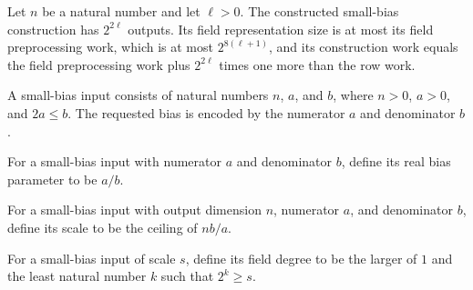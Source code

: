 \begin{theorem}
\label{FABL.buildExecutableSmallBiasConstruction_resource_bounds}
\leanok
{}
Let $n$ be a natural number and let $\ell>0$. The constructed small-bias
construction has $2^{2\ell}$ outputs. Its field representation size is at most
its field preprocessing work, which is at most $2^{8(\ell+1)}$, and its
construction work equals the field preprocessing work plus $2^{2\ell}$ times one
more than the row work.
\end{theorem}

\begin{definition}
\label{FABL.SmallBiasInput}
\leanok
A small-bias input consists of natural numbers $n$, $a$, and $b$, where $n>0$, $a>0$,
and $2a\le b$. The requested bias is encoded by the numerator $a$ and denominator $b$.
\end{definition}

\begin{definition}
\label{FABL.SmallBiasInput.epsilon}
\leanok
{}
For a small-bias input with numerator $a$ and denominator $b$, define its real bias
parameter to be $a/b$.
\end{definition}

\begin{definition}
\label{FABL.SmallBiasInput.scale}
\leanok
{}
For a small-bias input with output dimension $n$, numerator $a$, and denominator $b$,
define its scale to be the ceiling of $nb/a$.
\end{definition}

\begin{definition}
\label{FABL.SmallBiasInput.fieldDegree}
\leanok
{}
For a small-bias input of scale $s$, define its field degree to be the larger of $1$ and
the least natural number $k$ such that $2^k\ge s$.
\end{definition}

